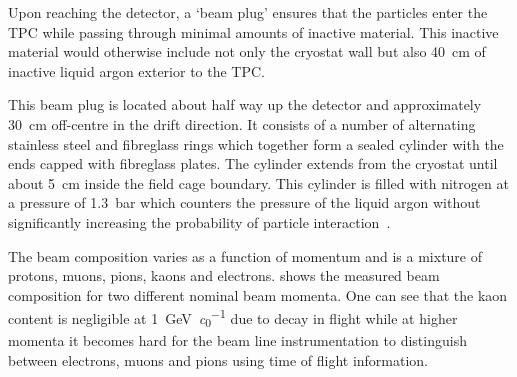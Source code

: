 Upon reaching the detector, a `beam plug' ensures that the particles enter the TPC while passing through minimal amounts of inactive material.
This inactive material would otherwise include not only the cryostat wall but also \SI{40}{\cm} of inactive liquid argon exterior to the TPC.

This beam plug is located about half way up the detector and approximately \SI{30}{\cm} off-centre in the drift direction.
It consists of a number of alternating stainless steel and fibreglass rings which together form a sealed cylinder with the ends capped with fibreglass plates.
The cylinder extends from the cryostat until about \SI{5}{\cm} inside the field cage boundary.
This cylinder is filled with nitrogen at a pressure of \SI{1.3}{\bar} which counters the pressure of the liquid argon without significantly increasing the probability of particle interaction~\cite{protodunePerformance}.

The beam composition varies as a function of momentum and is a mixture of protons, muons, pions, kaons and electrons.
 shows the measured beam composition for two different nominal beam momenta.
One can see that the kaon content is negligible at \SI{1}{\GeV\per\clight} due to decay in flight while at higher momenta it becomes hard for the beam line instrumentation to distinguish between electrons, muons and pions using time of flight information.

